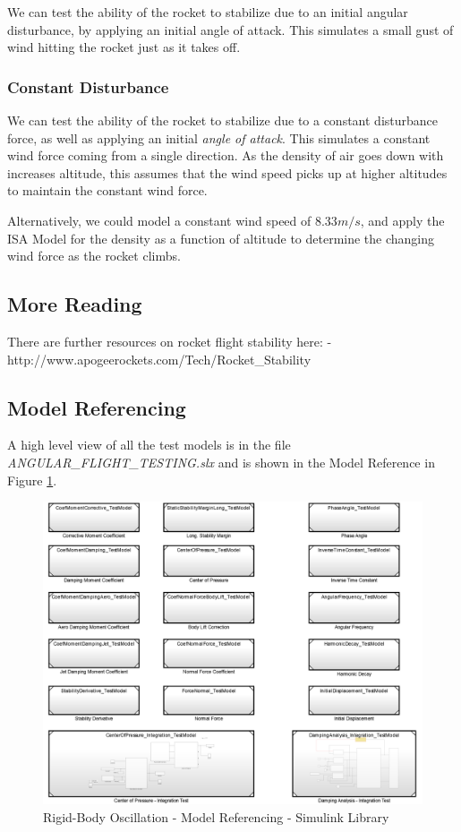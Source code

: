 \documentclass[]{article}
\begin{document}
We can test the ability of the rocket to stabilize due to an initial
angular disturbance, by applying an initial angle of attack. This
simulates a small gust of wind hitting the rocket just as it takes off.

\subsubsection{Constant Disturbance}\label{constant-disturbance}

We can test the ability of the rocket to stabilize due to a constant
disturbance force, as well as applying an initial \emph{angle of
attack}. This simulates a constant wind force coming from a single
direction. As the density of air goes down with increases altitude, this
assumes that the wind speed picks up at higher altitudes to maintain the
constant wind force.

Alternatively, we could model a constant wind speed of \(8.33 m/s\), and
apply the ISA Model for the density as a function of altitude to
determine the changing wind force as the rocket climbs.

\subsection{More Reading}\label{more-reading}

There are further resources on rocket flight stability here: -
http://www.apogeerockets.com/Tech/Rocket\_Stability

\clearpage

\subsection{Model Referencing}\label{model-referencing-2}

A high level view of all the test models is in the file
\emph{ANGULAR\_FLIGHT\_TESTING.slx} and is shown in the Model Reference
in Figure \ref{angular_model_reference_label}.

\begin{figure}[htbp]
\centering
\includegraphics{images/ANGULAR_FLIGHT_TESTING.png}
\caption{Rigid-Body Oscillation - Model Referencing - Simulink
Library\label{angular_model_reference_label}}
\end{figure}
\end{document}

